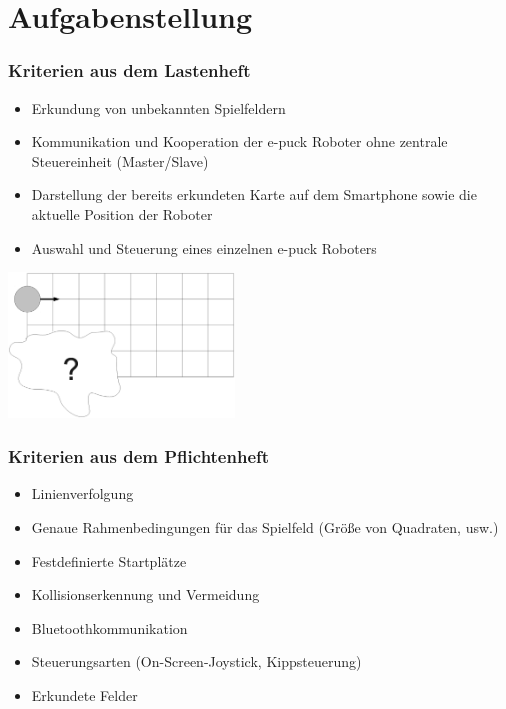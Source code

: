 \documentclass{beamer}
\begin{document}
\section{Aufgabenstellung}

\begin{frame}
  \frametitle{Kriterien aus dem Lastenheft}
  
	\begin{itemize}
		\item Erkundung von unbekannten Spielfeldern
		\item Kommunikation und Kooperation der e-puck Roboter ohne zentrale Steuereinheit 				(Master/Slave)
		\item Darstellung der bereits erkundeten Karte auf dem Smartphone sowie die 					aktuelle Position der Roboter
		\item Auswahl und Steuerung eines einzelnen e-puck Roboters
	\end{itemize}
	\vspace{15pt}
	\begin{center}
		\includegraphics[width=6cm]{images/unerkundet.eps}  
	\end{center}
	
\end{frame}

\begin{frame}
  \frametitle{Kriterien aus dem Pflichtenheft}
  
  	\begin{itemize}
  		\item Linienverfolgung
		\item Genaue Rahmenbedingungen für das Spielfeld (Größe von Quadraten, usw.)
		\item Festdefinierte Startplätze
		\item Kollisionserkennung und Vermeidung
		\item Bluetoothkommunikation
		\item Steuerungsarten (On-Screen-Joystick, Kippsteuerung)
		\item Erkundete Felder
	\end{itemize}  
\end{frame}
\end{document}
